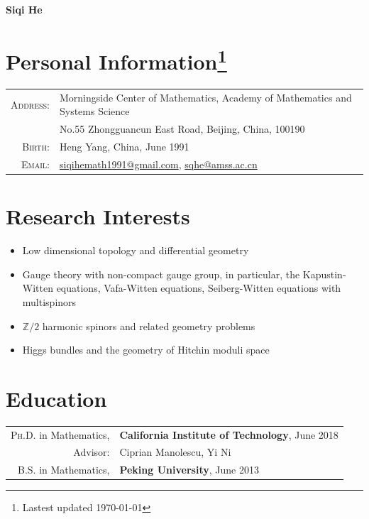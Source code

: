 \documentclass[a4paper,10pt]{article}
\begin{document}
\begin{center}
    {\Huge \textbf{Siqi He}}
\end{center}
\vspace{0.5cm}

\section*{Personal Information\footnote{Lastest updated {\today}}}
\begin{tabular}{rl}
    \textsc{Address:} & Morningside Center of Mathematics, Academy of Mathematics and Systems Science\\
    &No.55 Zhongguancun East Road, Beijing, China, 100190 \\
    \textsc{Birth:} & Heng Yang, China, June 1991 \\
    \textsc{Email:} & \href{mailto:siqihemath1991@gmail.com}{siqihemath1991@gmail.com}, \href{mailto:sqhe@amss.ac.cn}{sqhe@amss.ac.cn} \\
\end{tabular}

\section*{Research Interests}
\begin{itemize}[leftmargin=1.5cm]
    \item Low dimensional topology and differential geometry
    \item Gauge theory with non-compact gauge group, in particular, the Kapustin-Witten equations, Vafa-Witten equations, Seiberg-Witten equations with multispinors
    \item $\mathbb{Z}/2$ harmonic spinors and related geometry problems
    \item Higgs bundles and the geometry of Hitchin moduli space
\end{itemize}

\section*{Education}
\begin{tabular}{rl}
    \textsc{Ph.D.} in Mathematics, & \textbf{California Institute of Technology}, June 2018 \\
    Advisor: & Ciprian Manolescu, Yi Ni \\
    \textsc{B.S.} in Mathematics, & \textbf{Peking University}, June 2013 \\
\end{tabular}
\end{document}
